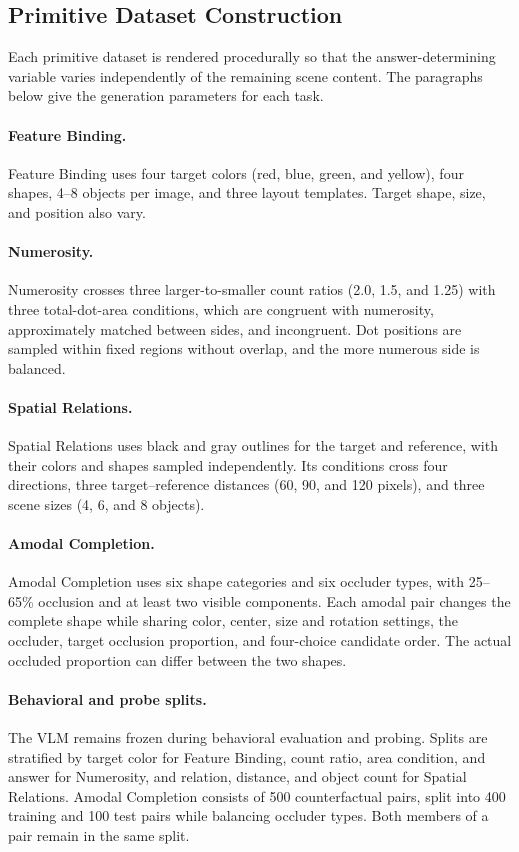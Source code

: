 \documentclass{article} %
\begin{document}
\subsection{Primitive Dataset Construction}

Each primitive dataset is rendered procedurally so that the answer-determining variable varies independently of the remaining scene content. The paragraphs below give the generation parameters for each task.

\paragraph{Feature Binding.}
Feature Binding uses four target colors (red, blue, green, and yellow), four shapes, 4--8 objects per image, and three layout templates. Target shape, size, and position also vary.

\paragraph{Numerosity.}
Numerosity crosses three larger-to-smaller count ratios (2.0, 1.5, and 1.25) with three total-dot-area conditions, which are congruent with numerosity, approximately matched between sides, and incongruent. Dot positions are sampled within fixed regions without overlap, and the more numerous side is balanced.

\paragraph{Spatial Relations.}
Spatial Relations uses black and gray outlines for the target and reference, with their colors and shapes sampled independently. Its conditions cross four directions, three target--reference distances (60, 90, and 120 pixels), and three scene sizes (4, 6, and 8 objects).

\paragraph{Amodal Completion.}
Amodal Completion uses six shape categories and six occluder types, with 25--65\% occlusion and at least two visible components. Each amodal pair changes the complete shape while sharing color, center, size and rotation settings, the occluder, target occlusion proportion, and four-choice candidate order. The actual occluded proportion can differ between the two shapes.

\paragraph{Behavioral and probe splits.}
The VLM remains frozen during behavioral evaluation and probing. Splits are stratified by target color for Feature Binding, count ratio, area condition, and answer for Numerosity, and relation, distance, and object count for Spatial Relations. Amodal Completion consists of 500 counterfactual pairs, split into 400 training and 100 test pairs while balancing occluder types. Both members of a pair remain in the same split.
\end{document}
